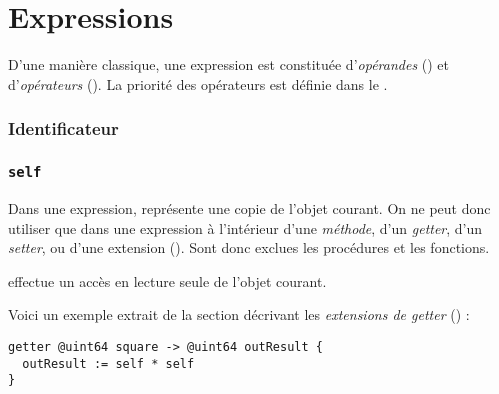 
\chapter{Expressions}

D'une manière classique, une expression est constituée d'\emph{opérandes} () et d'\emph{opérateurs} (). La priorité des opérateurs est définie dans le .





\subsection{Identificateur}

\subsection{\texttt{self}}

Dans une expression,  représente une copie de l'objet courant. On ne peut donc utiliser  que dans une expression à l'intérieur d'une \emph{méthode}, d'un \emph{getter}, d'un \emph{setter}, ou d'une extension (). Sont donc exclues les procédures et les fonctions.

 effectue un accès en lecture seule de l'objet courant. 

Voici un exemple extrait de la section décrivant les \emph{extensions de getter} () :
\begin{lstlisting}[language=galgas]
getter @uint64 square -> @uint64 outResult {
  outResult := self * self
}
\end{lstlisting}










